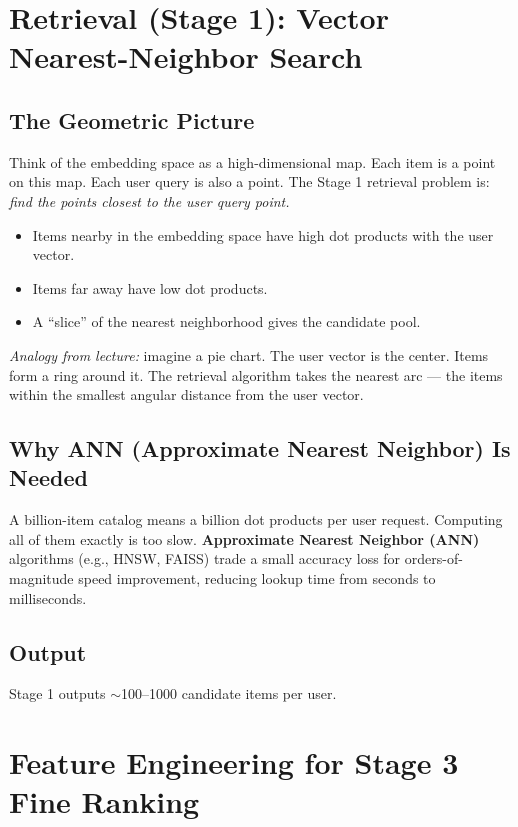\documentclass[11pt]{article}
\begin{document}
\newpage
\section{Retrieval (Stage 1): Vector Nearest-Neighbor Search}

\subsection{The Geometric Picture}
Think of the embedding space as a high-dimensional map. Each item is a
point on this map. Each user query is also a point. The Stage 1 retrieval
problem is: \textit{find the points closest to the user query point.}

\begin{itemize}
    \item Items nearby in the embedding space have high dot products with
      the user vector.
    \item Items far away have low dot products.
    \item A ``slice'' of the nearest neighborhood gives the candidate pool.
\end{itemize}

\textit{Analogy from lecture:} imagine a pie chart. The user vector is the
center. Items form a ring around it. The retrieval algorithm takes the
nearest arc --- the items within the smallest angular distance from the
user vector.

\subsection{Why ANN (Approximate Nearest Neighbor) Is Needed}
A billion-item catalog means a billion dot products per user request.
Computing all of them exactly is too slow. \textbf{Approximate Nearest
Neighbor (ANN)} algorithms (e.g., HNSW, FAISS) trade a small accuracy
loss for orders-of-magnitude speed improvement, reducing lookup time
from seconds to milliseconds.

\subsection{Output}
Stage 1 outputs $\sim$100--1000 candidate items per user.


\newpage
\section{Feature Engineering for Stage 3 Fine Ranking}
\end{document}
